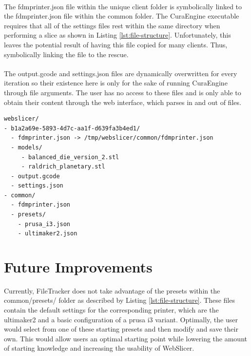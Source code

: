 \paragraph{}
The fdmprinter.json file within the unique client folder is symbolically linked to the fdmprinter.json file within the common folder. 
The CuraEngine executable requires that all of the settings files rest within the same directory when performing a slice as shown in Listing \ref{lst:file-structure}.
Unfortunately, this leaves the potential result of having this file copied for many clients. 
Thus, symbolically linking the file to the rescue.

\paragraph{}
The output.gcode and settings.json files are dynamically overwritten for every iteration so their existence here is only for the sake of running CuraEngine through file arguments.
The user has no access to these files and is only able to obtain their content through the web interface, which parses in and out of files.

\begin{lstlisting}[language=XML, label={lst:file-structure}, caption=WebSlicer's underlying file structure supported by FileTracker.]
webslicer/
- b1a2a69e-5893-4d7c-aa1f-d639fa3b4ed1/
  - fdmprinter.json -> /tmp/webslicer/common/fdmprinter.json
  - models/
     - balanced_die_version_2.stl
     - raldrich_planetary.stl
  - output.gcode
  - settings.json
- common/
  - fdmprinter.json
  - presets/
    - prusa_i3.json
    - ultimaker2.json
\end{lstlisting}

\section{Future Improvements}
\paragraph{}
Currently, FileTracker does not take advantage of the presets within the common/presets/ folder as described by Listing \ref{lst:file-structure}. 
These files contain the default settings for the corresponding printer, which are the ultimaker2 and a basic configuration of a prusa i3 variant. 
Optimally, the user would select from one of these starting presets and then modify and save their own.
This would allow users an optimal starting point while lowering the amount of starting knowledge and increasing the usability of WebSlicer.

